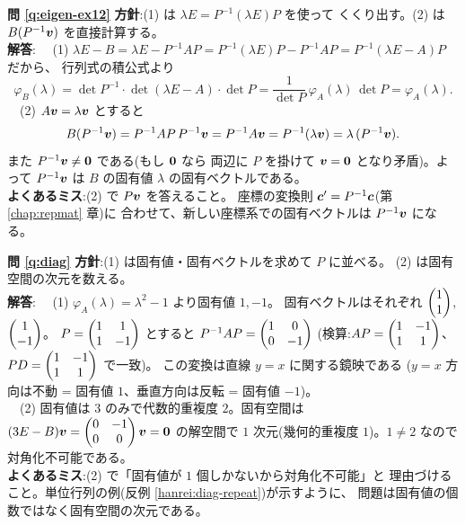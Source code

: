 \bigskip
\noindent\textbf{問 \ref{q:eigen-ex12}}\quad
\textbf{方針}:(1) は $\lambda E = P^{-1}(\lambda E)P$ を使って
くくり出す。(2) は $B(P^{-1}\bm{v})$ を直接計算する。\\
\textbf{解答}:
　(1) $\lambda E - B = \lambda E - P^{-1}AP
= P^{-1}(\lambda E)P - P^{-1}AP = P^{-1}(\lambda E - A)P$ だから、
行列式の積公式より
\[
\varphi_B(\lambda) = \det P^{-1} \cdot \det(\lambda E - A) \cdot \det P
= \frac{1}{\det P}\,\varphi_A(\lambda)\,\det P = \varphi_A(\lambda).
\]
　(2) $A\bm{v} = \lambda\bm{v}$ とすると
\[
B(P^{-1}\bm{v}) = P^{-1}AP\,P^{-1}\bm{v} = P^{-1}A\bm{v}
= P^{-1}(\lambda\bm{v}) = \lambda\,(P^{-1}\bm{v}).
\]
また $P^{-1}\bm{v} \neq \bm{0}$ である(もし $\bm{0}$ なら
両辺に $P$ を掛けて $\bm{v} = \bm{0}$ となり矛盾)。よって
$P^{-1}\bm{v}$ は $B$ の固有値 $\lambda$ の固有ベクトルである。\\
\textbf{よくあるミス}:(2) で $P\bm{v}$ を答えること。
座標の変換則 $\bm{c}' = P^{-1}\bm{c}$(第 \ref{chap:repmat} 章)に
合わせて、新しい座標系での固有ベクトルは $P^{-1}\bm{v}$ になる。

\bigskip
\noindent\textbf{問 \ref{q:diag}}\quad
\textbf{方針}:(1) は固有値・固有ベクトルを求めて $P$ に並べる。
(2) は固有空間の次元を数える。\\
\textbf{解答}:
　(1) $\varphi_A(\lambda) = \lambda^2 - 1$ より固有値 $1, -1$。
固有ベクトルはそれぞれ $\begin{pmatrix}1 \\ 1\end{pmatrix}$, $\begin{pmatrix}1 \\ -1\end{pmatrix}$。
$P = \begin{pmatrix}1 & 1 \\ 1 & -1\end{pmatrix}$ とすると
$P^{-1}AP = \begin{pmatrix}1 & 0 \\ 0 & -1\end{pmatrix}$
(検算:$AP = \begin{pmatrix}1 & -1 \\ 1 & 1\end{pmatrix}$、
$PD = \begin{pmatrix}1 & -1 \\ 1 & 1\end{pmatrix}$ で一致)。
この変換は直線 $y = x$ に関する鏡映である
($y = x$ 方向は不動 = 固有値 $1$、垂直方向は反転 = 固有値 $-1$)。\\
　(2) 固有値は $3$ のみで代数的重複度 $2$。固有空間は
$(3E - B)\bm{v} = \begin{pmatrix}0 & -1 \\ 0 & 0\end{pmatrix}\bm{v} = \bm{0}$ の解空間で
$1$ 次元(幾何的重複度 $1$)。$1 \neq 2$ なので対角化不可能である。\\
\textbf{よくあるミス}:(2) で「固有値が $1$ 個しかないから対角化不可能」と
理由づけること。単位行列の例(反例 \ref{hanrei:diag-repeat})が示すように、
問題は固有値の個数ではなく固有空間の次元である。

